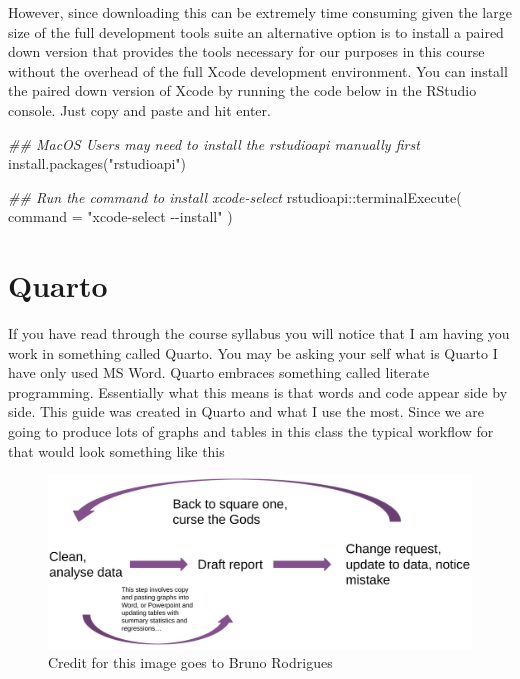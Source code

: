 \documentclass[
  letterpaper,
  DIV=11,
  numbers=noendperiod,
  oneside]{scrreprt}
\newenvironment{Shaded}{\begin{snugshade}}{\end{snugshade}}
\newcommand{\AttributeTok}[1]{\textcolor[rgb]{0.40,0.45,0.13}{#1}}
\newcommand{\DocumentationTok}[1]{\textcolor[rgb]{0.37,0.37,0.37}{\textit{#1}}}
\newcommand{\FunctionTok}[1]{\textcolor[rgb]{0.28,0.35,0.67}{#1}}
\newcommand{\NormalTok}[1]{\textcolor[rgb]{0.00,0.23,0.31}{#1}}
\newcommand{\SpecialCharTok}[1]{\textcolor[rgb]{0.37,0.37,0.37}{#1}}
\newcommand{\StringTok}[1]{\textcolor[rgb]{0.13,0.47,0.30}{#1}}
\begin{document}
However, since downloading this can be extremely time consuming given
the large size of the full development tools suite an alternative option
is to install a paired down version that provides the tools necessary
for our purposes in this course without the overhead of the full Xcode
development environment. You can install the paired down version of
Xcode by running the code below in the RStudio console. Just copy and
paste and hit enter.

\begin{Shaded}
\begin{Highlighting}[]
\DocumentationTok{\#\# MacOS Users may need to install the rstudioapi manually first}
\FunctionTok{install.packages}\NormalTok{(}\StringTok{"rstudioapi"}\NormalTok{)}

\DocumentationTok{\#\# Run the command to install xcode{-}select}
\NormalTok{rstudioapi}\SpecialCharTok{::}\FunctionTok{terminalExecute}\NormalTok{(}
  \AttributeTok{command =} \StringTok{"xcode{-}select {-}{-}install"}
\NormalTok{)}
\end{Highlighting}
\end{Shaded}

\hypertarget{quarto}{%
\section{Quarto}\label{quarto}}

If you have read through the course syllabus you will notice that I am
having you work in something called Quarto. You may be asking your self
what is Quarto I have only used MS Word. Quarto embraces something
called literate programming. Essentially what this means is that words
and code appear side by side. This guide was created in Quarto and what
I use the most. Since we are going to produce lots of graphs and tables
in this class the typical workflow for that would look something like
this

\begin{figure}

{\centering \includegraphics[width=5.98in,height=\textheight]{figs/report_draft_loop.png}

}

\caption{Credit for this image goes to Bruno Rodrigues}

\end{figure}
\end{document}
